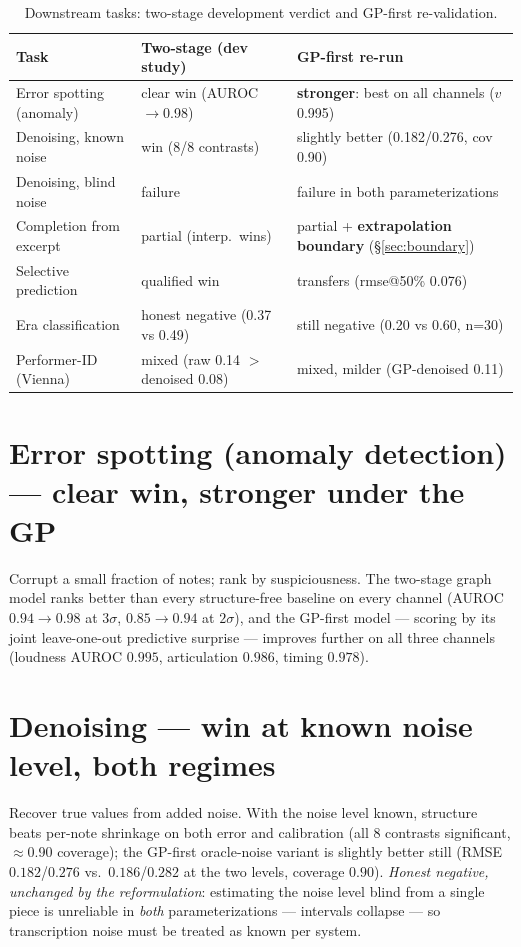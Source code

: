 \documentclass[11pt,a4paper]{report}
\begin{document}
\begin{table}[h]\centering
\caption{Downstream tasks: two-stage development verdict and GP-first
re-validation.}\label{tab:downstream-both}
\footnotesize
\begin{tabular}{@{}p{4.1cm}p{4.3cm}p{4.6cm}@{}}
\toprule
Task & Two-stage (dev study) & GP-first re-run \\
\midrule
Error spotting (anomaly) & clear win (AUROC $\to$0.98) & \textbf{stronger}: best on all channels ($v$ 0.995) \\
Denoising, known noise & win (8/8 contrasts) & slightly better (0.182/0.276, cov 0.90) \\
Denoising, blind noise & failure & failure in both parameterizations \\
Completion from excerpt & partial (interp.\ wins) & partial + \textbf{extrapolation boundary} (\S\ref{sec:boundary}) \\
Selective prediction & qualified win & transfers (rmse@50\% 0.076) \\
Era classification & honest negative (0.37 vs 0.49) & still negative (0.20 vs 0.60, n=30) \\
Performer-ID (Vienna) & mixed (raw 0.14 $>$ denoised 0.08) & mixed, milder (GP-denoised 0.11) \\
\bottomrule
\end{tabular}
\end{table}

\section{Error spotting (anomaly detection) --- clear win, stronger under the GP}
Corrupt a small fraction of notes; rank by suspiciousness. The two-stage graph
model ranks better than every structure-free baseline on every channel (AUROC
$0.94 \to 0.98$ at $3\sigma$, $0.85 \to 0.94$ at $2\sigma$), and the GP-first model
--- scoring by its joint leave-one-out predictive surprise --- improves further on
all three channels (loudness AUROC $0.995$, articulation $0.986$, timing $0.978$).

\section{Denoising --- win at known noise level, both regimes}
Recover true values from added noise. With the noise level known, structure beats
per-note shrinkage on both error and calibration (all 8 contrasts significant,
$\approx$0.90 coverage); the GP-first oracle-noise variant is slightly better still
(RMSE $0.182$/$0.276$ vs.\ $0.186$/$0.282$ at the two levels, coverage $0.90$).
\emph{Honest negative, unchanged by the reformulation}: estimating the noise level
blind from a single piece is unreliable in \emph{both} parameterizations ---
intervals collapse --- so transcription noise must be treated as known per system.
\end{document}

